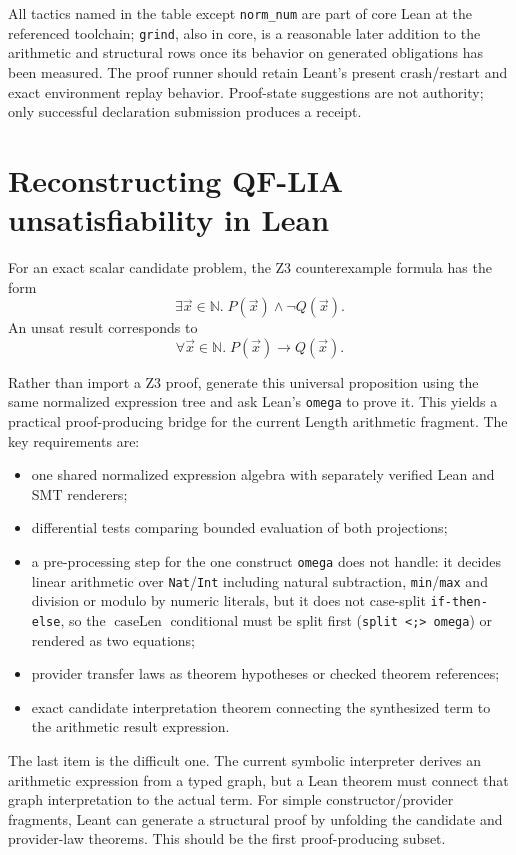 \documentclass[11pt,oneside]{report}
\newcommand{\Nat}{\mathbb{N}}
\newcommand{\code}[1]{\texttt{#1}}
\begin{document}
All tactics named in the table except \code{norm\_num} are part of core Lean at the referenced toolchain; \code{grind}, also in core, is a reasonable later addition to the arithmetic and structural rows once its behavior on generated obligations has been measured. The proof runner should retain Leant's present crash/restart and exact environment replay behavior. Proof-state suggestions are not authority; only successful declaration submission produces a receipt.

\section{Reconstructing QF-LIA unsatisfiability in Lean}

For an exact scalar candidate problem, the Z3 counterexample formula has the form
\[
  \exists \vec{x}\in\Nat.\;P(\vec{x})\land\neg Q(\vec{x}).
\]
An unsat result corresponds to
\[
  \forall \vec{x}\in\Nat.\;P(\vec{x})\to Q(\vec{x}).
\]

Rather than import a Z3 proof, generate this universal proposition using the same normalized expression tree and ask Lean's \code{omega} to prove it. This yields a practical proof-producing bridge for the current Length arithmetic fragment. The key requirements are:

\begin{itemize}[leftmargin=2em]
\item one shared normalized expression algebra with separately verified Lean and SMT renderers;
\item differential tests comparing bounded evaluation of both projections;
\item a pre-processing step for the one construct \code{omega} does not handle: it decides linear arithmetic over \code{Nat}/\code{Int} including natural subtraction, \code{min}/\code{max} and division or modulo by numeric literals, but it does not case-split \code{if-then-else}, so the $\operatorname{caseLen}$ conditional must be split first (\code{split <;> omega}) or rendered as two equations;
\item provider transfer laws as theorem hypotheses or checked theorem references;
\item exact candidate interpretation theorem connecting the synthesized term to the arithmetic result expression.
\end{itemize}

The last item is the difficult one. The current symbolic interpreter derives an arithmetic expression from a typed graph, but a Lean theorem must connect that graph interpretation to the actual term. For simple constructor/provider fragments, Leant can generate a structural proof by unfolding the candidate and provider-law theorems. This should be the first proof-producing subset.
\end{document}
